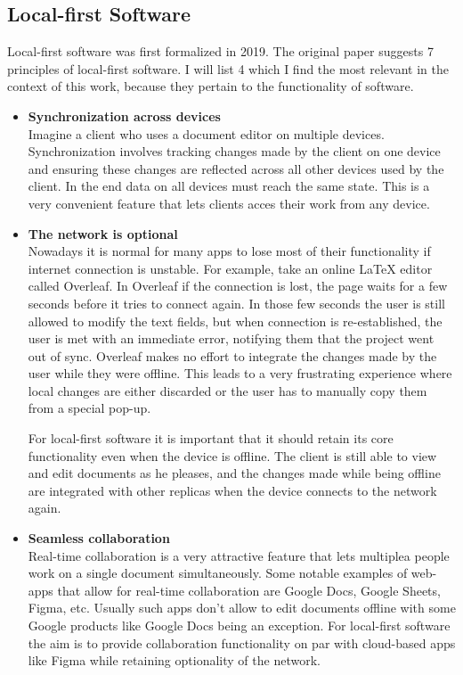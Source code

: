 \documentclass[a4paper, 11pt, oneside]{article}
\theoremstyle{definition}
\begin{document}
\subsection{Local-first Software}
Local-first software was first formalized in 2019. The original paper \cite{localfirst} suggests 7 principles of local-first software. I will list 4 which I find the most relevant in the context of this work, because they pertain to the functionality of software.
\begin{itemize}
    \item \textbf{Synchronization across devices} \\
    Imagine a client who uses a document editor on multiple devices. Synchronization involves tracking changes made by the client on one device and ensuring these changes are reflected across all other devices used by the client. In the end data on all devices must reach the same state. This is a very convenient feature that lets clients acces their work from any device.

    \item \textbf{The network is optional} \\
    Nowadays it is normal for many apps to lose most of their functionality if internet connection is unstable. For example, take an online LaTeX editor called Overleaf. In Overleaf if the connection is lost, the page waits for a few seconds before it tries to connect again. In those few seconds the user is still allowed to modify the text fields, but when connection is re-established, the user is met with an immediate error, notifying them that the project went out of sync. Overleaf makes no effort to integrate the changes made by the user while they were offline. This leads to a very frustrating experience where local changes are either discarded or the user has to manually copy them from a special pop-up.
    
    For local-first software it is important that it should retain its core functionality even when the device is offline. The client is still able to view and edit documents as he pleases, and the changes made while being offline are integrated with other replicas when the device connects to the network again.

    \item \textbf{Seamless collaboration} \\
    Real-time collaboration is a very attractive feature that lets multiplea people work on a single document simultaneously. Some notable examples of web-apps that allow for real-time collaboration are Google Docs, Google Sheets, Figma, etc. Usually such apps don't allow to edit documents offline with some Google products like Google Docs being an exception. For local-first software the aim is to provide collaboration functionality on par with cloud-based apps like Figma while retaining optionality of the network.


\end{itemize}
\end{document}
